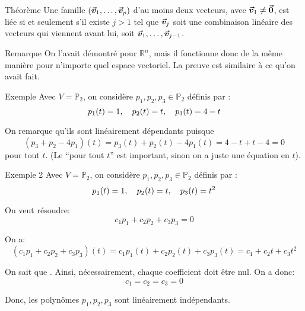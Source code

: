 \documentclass[a4paper]{article}
\begin{document}
\begin{parag}{Théorème}
    Une famille $\left(\bvec{v}_1, \ldots, \bvec{v}_p\right)$ d'au moins deux vecteurs, avec $\bm{\protect\vec{v}}_1 \neq \bm{\protect\vec{0}}$, est liée si et seulement s'il existe $j > 1$ tel que $\bm{\protect\vec{v}}_j$ soit une combinaison linéaire des vecteurs qui viennent avant lui, soit $\bm{\protect\vec{v}}_1, \ldots, \bm{\protect\vec{v}}_{j-1}$.

    \begin{subparag}{Remarque}
        On l'avait démontré pour $\mathbb{R}^{n}$, mais il fonctionne donc de la même manière pour n'importe quel espace vectoriel. La preuve est similaire à ce qu'on avait fait.
    \end{subparag}

\end{parag}

\begin{parag}{Exemple}
    Avec $V = \mathbb{P}_2$, on considère $p_1, p_2, p_3 \in \mathbb{P}_2$ définis par :
    \[p_1\left(t\right) = 1, \mathspace p_2\left(t\right) = t, \mathspace p_3\left(t\right) = 4 - t\]

    On remarque qu'ils sont linéairement dépendants puisque
\[\left(p_3 + p_2 - 4p_1\right)\left(t\right) = p_3\left(t\right) + p_2\left(t\right) - 4p_1\left(t\right) = 4 - t + t - 4 = 0 \]
    pour tout $t$. (Le ``pour tout $t$'' est important, sinon on a juste une équation en $t$).
\end{parag}

\begin{parag}{Exemple 2}
    Avec $V = \mathbb{P}_2$, on considère $p_1, p_2, p_3 \in \mathbb{P}_2$ définis par :
    \[p_1\left(t\right) = 1, \mathspace p_2\left(t\right) = t, \mathspace p_3\left(t\right) = t^2\]

    On veut résoudre:
    \[c_1 p_1 + c_2 p_2 + c_3p_3 = 0\]

    On a:
    \[\left(c_1 p_1 + c_2 p_2 + c_3p_3\right)\left(t\right) = c_1 p_1\left(t\right) + c_2 p_2\left(t\right) + c_3 p_3\left(t\right) = c_1 + c_2 t + c_3 t^2\]

    On sait que \textit{}. Ainsi, nécessairement, chaque coefficient doit être nul. On a donc:
    \[c_1 = c_2 = c_3 = 0\]

    Donc, les polynômes $p_1, p_2, p_3$ sont linéairement indépendants.

\end{parag}
\end{document}

